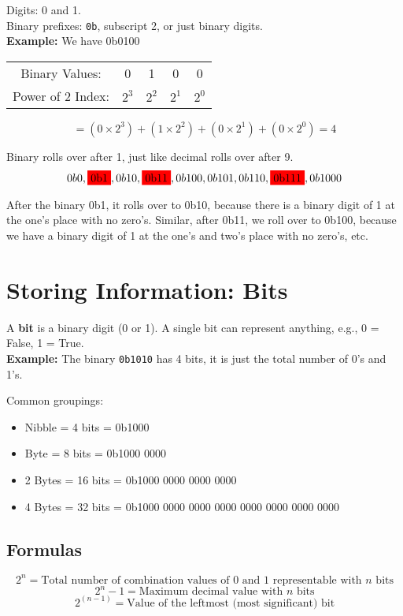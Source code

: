\documentclass{article}
\begin{document}
\noindent Digits: 0 and 1. \\

\noindent Binary prefixes: \texttt{0b}, subscript 2, or just binary digits. \\

\textbf{Example:} We have 0b0100 \\

\begin{center}
\begin{tabular}{c c c c c} 
Binary Values: & 0 & 1 & 0 & 0 \\
Power of 2 Index:  & $2^3$ & $2^2$ & $2^1$ & $2^0$ \\
\end{tabular}
\end{center} 

\[
= (0 \times 2^3) + (1 \times 2^2) + (0 \times 2^1) + (0 \times 2^0) = 4
\]

Binary rolls over after 1, just like decimal rolls over after 9. \\
\[
0b0, \text{\colorbox{red}{0b1}}, 0b10, \text{\colorbox{red}{0b11}}, 0b100, 0b101, 0b110, \text{\colorbox{red}{0b111}}, 0b1000
\]

After the binary 0b1, it rolls over to 0b10, because there is a binary digit of 1 at the one's place with no zero's. Similar, after 0b11, we roll over to 0b100, because
we have a binary digit of 1 at the one's and two's place with no zero's, etc.


\section{Storing Information: Bits}
\noindent A \textbf{bit} is a binary digit (0 or 1). A single bit can represent anything, e.g., 0 = False, 1 = True. \\

\textbf{Example:}  
The binary \texttt{0b1010} has 4 bits, it is just the total number of 0's and 1's.

Common groupings:
\begin{itemize}
  \item Nibble = 4 bits = 0b1000
  \item Byte = 8 bits = 0b1000 0000
  \item 2 Bytes = 16 bits = 0b1000 0000 0000 0000
  \item 4 Bytes = 32 bits = 0b1000 0000 0000 0000 0000 0000 0000 0000 
\end{itemize}

\subsection*{Formulas}
\[
2^n = \text{Total number of combination values of 0 and 1 representable with $n$ bits}
\]
\[
2^n - 1 = \text{Maximum decimal value with $n$ bits}
\]
\[
2^{(n-1)} = \text{Value of the leftmost (most significant) bit}
\] \\
\end{document}
